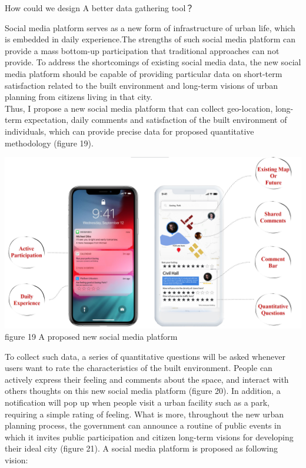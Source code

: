 \documentclass[
]{article}
\begin{document}
How could we design A better data gathering tool？

Social media platform serves as a new form of infrastructure of urban
life, which is embedded in daily experience.The strengths of such social
media platform can provide a mass bottom-up participation that
traditional approaches can not provide. To address the shortcomings of
existing social media data, the new social media platform should be
capable of providing particular data on short-term satisfaction related
to the built environment and long-term visions of urban planning from
citizens living in that city.\\
Thus, I propose a new social media platform that can collect
geo-location, long-term expectation, daily comments and satisfaction of
the built environment of individuals, which can provide precise data for
proposed quantitative methodology (figure 19).

\href{https://WTHSYZW.github.io/Thesis_2022/maps/app2.png}{\includegraphics{maps/app2.png}}\\
figure 19 A proposed new social media platform

To collect such data, a series of quantitative questions will be asked
whenever users want to rate the characteristics of the built
environment. People can actively express their feeling and comments
about the space, and interact with others thoughts on this new social
media platform (figure 20). In addition, a notification will pop up when
people visit a urban facility such as a park, requiring a simple rating
of feeling. What is more, throughout the new urban planning process, the
government can announce a routine of public events in which it invites
public participation and citizen long-term visions for developing their
ideal city (figure 21). A social media platform is proposed as following
vision:
\end{document}
